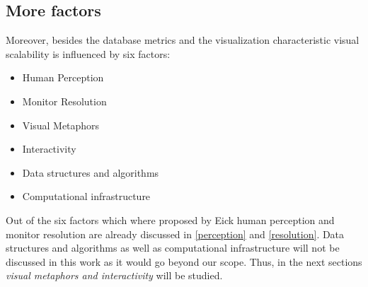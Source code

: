 


\subsection{More factors} \label{factors}
Moreover, besides the database metrics and the visualization characteristic visual scalability is influenced by six factors: 
\begin{itemize}
    \item Human Perception\cite{Keim2005,Deering1998}
    \item Monitor Resolution 
    \item Visual Metaphors
    \item Interactivity
    \item Data structures and algorithms
    \item Computational infrastructure
\end{itemize}

Out of the six factors which where proposed by Eick \cite{Eick2002} human perception and monitor resolution are already discussed in \ref{perception} and \ref{resolution}. Data structures and algorithms as well as computational infrastructure will not be discussed in this work as it would go beyond our scope. 
Thus, in the next sections \textit{visual metaphors and interactivity} will be studied.

